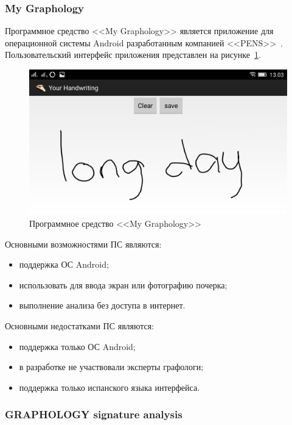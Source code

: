 \subsubsection{My Graphology}
\label{sub:domain:analogs:my_graphology}

Программное средство <<My Graphology>> является приложение для операционной системы Android разработанным компанией <<PENS>>~\cite{analogs_my_graphology}. Пользовательский интерфейс приложения представлен на рисунке~\ref{fig:domain:analogs:my_graphology}.

\begin{figure}[h]
    \centering
    \includegraphics[width=0.4\textheight]{figures/analog_my_graphology.jpeg}
    \caption{Программное средство <<My Graphology>>}
    \label{fig:domain:analogs:my_graphology}
\end{figure}

Основными возможностями ПС являются:
\begin{itemize}
  \item поддержка ОС Android;
  \item использовать для ввода экран или фотографию почерка;
  \item выполнение анализа без доступа в интернет.
\end{itemize}

Основными недостатками ПС являются:
\begin{itemize}
  \item поддержка только ОС Android;
  \item в разработке не участвовали эксперты графологи;
  \item поддержка только испанского языка интерфейса.
\end{itemize}

\subsubsection{GRAPHOLOGY signature analysis}
\label{sub:domain:analogs:graphology_sign_analysis}

